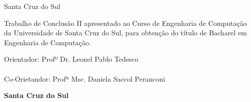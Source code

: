 \begin{titlepage}
\thispagestyle{empty}
	\begin{center}
	\par \vspace{250pt} {\textsc \nomedocurso} %
	\par \vspace{150pt} {\nomedoaluno} %
	\par \vspace{100pt}{\textbf{\textsc{\titulo}}} %
	\par \vfill {{Santa Cruz do Sul}\\ {\the\year}}
	\end{center}
\end{titlepage}

\thispagestyle{empty}
\begin{center}
	\par {\nomedoaluno}
	\par \vspace{100pt}{\textbf{\textsc{\titulo}}}
\end{center}
\par \vspace{90pt} \hspace*{150pt}\parbox{9cm}{{\large Trabalho de Conclusão II apresentado ao Curso de Engenharia de Computação da Universidade de Santa Cruz do Sul, para obtenção do título de Bacharel em Engenharia de Computação.}}
\par
\vspace{1cm}
\hspace*{150pt}\parbox{9cm}{{
	Orientador: Profº Dr. Leonel Pablo Tedesco
	\\
	\\
	Co-Orietandor: Profª Msc. Daniela Saccol Peranconi
	}}
\vspace{2cm}
\par
\vfill
\begin{center}
	\textbf{{Santa Cruz do Sul}\\ {\the\year}}
\end{center}

